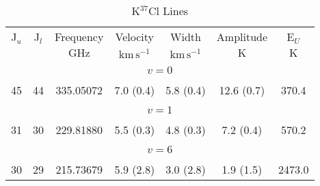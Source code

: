 \begin{table*}[htp]
\centering
\caption{K$^{37}$Cl Lines}
\begin{tabular}{ccccccc}
\label{tab:K37Cl_salt_lines}
 J$_u$ & J$_l$ & Frequency & Velocity & Width & Amplitude & E$_U$ \\
  &  & $\mathrm{GHz}$ & $\mathrm{km\,s^{-1}}$ & $\mathrm{km\,s^{-1}}$ & $\mathrm{K}$ & $\mathrm{K}$ \\
\hline
&\vspace{-0.75em}\\
\multicolumn{7}{c}{$v = 0$} \\
\vspace{-0.75em}\\
 45 & 44 & 335.05072 & 7.0 (0.4) & 5.8 (0.4) & 12.6 (0.7) & 370.4 \\
&\vspace{-0.75em}\\
\multicolumn{7}{c}{$v = 1$} \\
\vspace{-0.75em}\\
 31 & 30 & 229.81880 & 5.5 (0.3) & 4.8 (0.3) & 7.2 (0.4) & 570.2 \\
\hline
&\vspace{-0.75em}\\
\multicolumn{7}{c}{$v = 6$} \\
\vspace{-0.75em}\\
 30 & 29 & 215.73679 & 5.9 (2.8) & 3.0 (2.8) & 1.9 (1.5) & 2473.0 \\
\end{tabular}

\par 
\end{table*}
